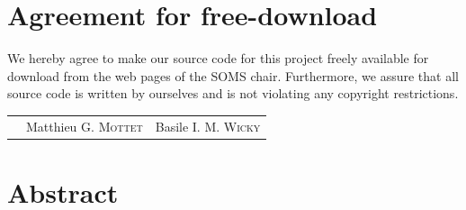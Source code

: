 \documentclass[11pt]{article} %
\begin{document}
\newpage

\section*{Agreement for free-download} %
\thispagestyle{empty} %

\bigskip
\bigskip

\large We hereby agree to make our source code for this project freely available for download from the web pages of the SOMS chair. Furthermore, we assure that all source code is written by ourselves and is not violating any copyright restrictions.

\begin{center}

\bigskip
\bigskip

\begin{tabular}{@{}p{2cm}@{}p{6cm}@{}@{}p{6cm}@{}}
\begin{minipage}{3.3cm}
\end{minipage}
&
\begin{minipage}{6cm}
\vspace{3cm} \large{Matthieu G. \textsc{Mottet}}

\vspace{\baselineskip}

\end{minipage}
&
\begin{minipage}{6cm}

\vspace{3cm}\large{Basile I. M. \textsc{Wicky}}
\vspace{\baselineskip}
\end{minipage}
\end{tabular}


\end{center}
\newpage



\tableofcontents




\newpage

\section{Abstract}\indent
\end{document}
